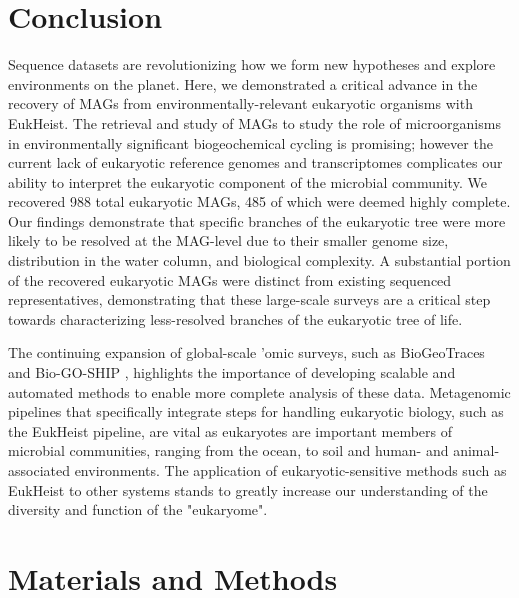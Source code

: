 \documentclass[12pt]{article}
\numberwithin{equation}{section}
\begin{document}
\section*{Conclusion}
Sequence datasets are revolutionizing how we form new hypotheses and explore environments on the planet. Here, we demonstrated a critical advance in the recovery of MAGs from environmentally-relevant eukaryotic organisms with EukHeist. The retrieval and study of MAGs to study the role of microorganisms in environmentally significant biogeochemical cycling is promising; however the current lack of eukaryotic reference genomes and transcriptomes complicates our ability to interpret the eukaryotic component of the microbial community. We recovered 988 total eukaryotic MAGs, 485 of which were deemed highly complete. Our findings demonstrate that specific branches of the eukaryotic tree were more likely to be resolved at the MAG-level due to their smaller genome size, distribution in the water column, and biological complexity. A substantial portion of the recovered eukaryotic MAGs were distinct from existing sequenced representatives, demonstrating that these large-scale surveys are a critical step towards characterizing less-resolved branches of the eukaryotic tree of life. 

The continuing expansion of global-scale 'omic surveys, such as BioGeoTraces \cite{Biller_2018} and Bio-GO-SHIP \citep{Ustick_2021}, highlights the importance of developing scalable and automated methods to enable more complete analysis of these data. Metagenomic pipelines that specifically integrate steps for handling eukaryotic biology, such as the EukHeist pipeline, are vital as eukaryotes are important members of microbial communities, ranging from the ocean, to soil \citep{bailly2007soil} and human- \citep{Luke__2015} and animal-associated \citep{Campo_2019} environments. The application of eukaryotic-sensitive methods such as EukHeist to other systems stands to greatly increase our understanding of the diversity and function of the "eukaryome".

\section*{Materials and Methods}
\end{document}
